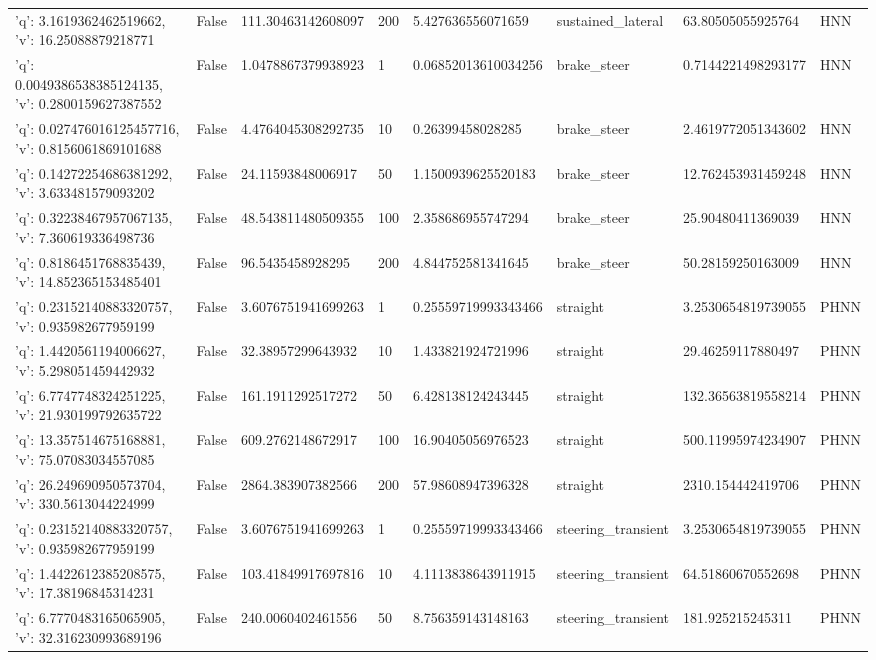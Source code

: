 \begin{tabular}{llllllll}
{'q': 3.1619362462519662, 'v': 16.25088879218771} & False & 111.30463142608097 & 200 & 5.427636556071659 & sustained\_lateral & 63.80505055925764 & HNN \\
{'q': 0.0049386538385124135, 'v': 0.2800159627387552} & False & 1.0478867379938923 & 1 & 0.06852013610034256 & brake\_steer & 0.7144221498293177 & HNN \\
{'q': 0.027476016125457716, 'v': 0.8156061869101688} & False & 4.4764045308292735 & 10 & 0.26399458028285 & brake\_steer & 2.4619772051343602 & HNN \\
{'q': 0.14272254686381292, 'v': 3.633481579093202} & False & 24.11593848006917 & 50 & 1.1500939625520183 & brake\_steer & 12.762453931459248 & HNN \\
{'q': 0.32238467957067135, 'v': 7.360619336498736} & False & 48.543811480509355 & 100 & 2.358686955747294 & brake\_steer & 25.90480411369039 & HNN \\
{'q': 0.8186451768835439, 'v': 14.852365153485401} & False & 96.5435458928295 & 200 & 4.844752581341645 & brake\_steer & 50.28159250163009 & HNN \\
{'q': 0.23152140883320757, 'v': 0.935982677959199} & False & 3.6076751941699263 & 1 & 0.25559719993343466 & straight & 3.2530654819739055 & PHNN \\
{'q': 1.4420561194006627, 'v': 5.298051459442932} & False & 32.38957299643932 & 10 & 1.433821924721996 & straight & 29.46259117880497 & PHNN \\
{'q': 6.7747748324251225, 'v': 21.930199792635722} & False & 161.1911292517272 & 50 & 6.428138124243445 & straight & 132.36563819558214 & PHNN \\
{'q': 13.357514675168881, 'v': 75.07083034557085} & False & 609.2762148672917 & 100 & 16.90405056976523 & straight & 500.11995974234907 & PHNN \\
{'q': 26.249690950573704, 'v': 330.5613044224999} & False & 2864.383907382566 & 200 & 57.98608947396328 & straight & 2310.154442419706 & PHNN \\
{'q': 0.23152140883320757, 'v': 0.935982677959199} & False & 3.6076751941699263 & 1 & 0.25559719993343466 & steering\_transient & 3.2530654819739055 & PHNN \\
{'q': 1.4422612385208575, 'v': 17.38196845314231} & False & 103.41849917697816 & 10 & 4.1113838643911915 & steering\_transient & 64.51860670552698 & PHNN \\
{'q': 6.7770483165065905, 'v': 32.316230993689196} & False & 240.0060402461556 & 50 & 8.756359143148163 & steering\_transient & 181.925215245311 & PHNN \\

\end{tabular}
